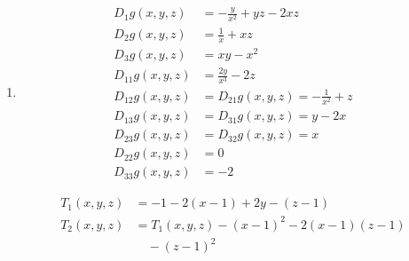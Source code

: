 \documentclass[a4paper,12pt]{article}
\begin{document}
\begin{enumerate}[label=\alph*)]
    \item
    \begin{align*}
        D_1 g(x,y,z) &= -\frac{y}{x^2} + yz - 2xz \\
        D_2 g(x,y,z) &= \frac{1}{x} + xz \\
        D_3 g(x,y,z) &= xy - x^2 \\
        D_{11} g(x,y,z) &= \frac{2y}{x^3} - 2z \\
        D_{12} g(x,y,z) &= D_{21} g(x,y,z) = -\frac{1}{x^2} + z \\
        D_{13} g(x,y,z) &= D_{31} g(x,y,z) = y - 2x \\
        D_{23} g(x,y,z) &= D_{32} g(x,y,z) = x \\
        D_{22} g(x,y,z) &= 0 \\
        D_{33} g(x,y,z) &= -2
    \end{align*}

    \begin{align*}
        T_1(x,y,z) &= -1 - 2(x-1) + 2y - (z-1) \\
        T_2(x,y,z) &= T_1(x,y,z) - (x-1)^2 - 2(x-1)(z-1) \\
                   &\quad - (z-1)^2
    \end{align*}

\end{enumerate}
\end{document}
